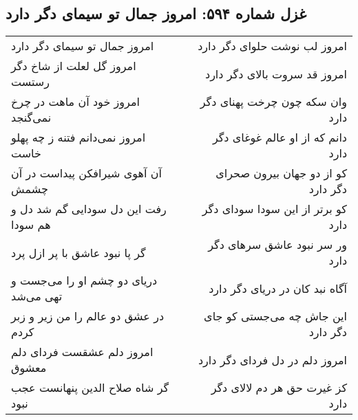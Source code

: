 \begin{center}
\section*{غزل شماره ۵۹۴: امروز جمال تو سیمای دگر دارد}
\label{sec:0594}
\begin{longtable}{l p{0.5cm} r}
امروز جمال تو سیمای دگر دارد
&&
امروز لب نوشت حلوای دگر دارد
\\
امروز گل لعلت از شاخ دگر رستست
&&
امروز قد سروت بالای دگر دارد
\\
امروز خود آن ماهت در چرخ نمی‌گنجد
&&
وان سکه چون چرخت پهنای دگر دارد
\\
امروز نمی‌دانم فتنه ز چه پهلو خاست
&&
دانم که از او عالم غوغای دگر دارد
\\
آن آهوی شیرافکن پیداست در آن چشمش
&&
کو از دو جهان بیرون صحرای دگر دارد
\\
رفت این دل سودایی گم شد دل و هم سودا
&&
کو برتر از این سودا سودای دگر دارد
\\
گر پا نبود عاشق با پر ازل پرد
&&
ور سر نبود عاشق سرهای دگر دارد
\\
دریای دو چشم او را می‌جست و تهی می‌شد
&&
آگاه نبد کان در دریای دگر دارد
\\
در عشق دو عالم را من زیر و زبر کردم
&&
این جاش چه می‌جستی کو جای دگر دارد
\\
امروز دلم عشقست فردای دلم معشوق
&&
امروز دلم در دل فردای دگر دارد
\\
گر شاه صلاح الدین پنهانست عجب نبود
&&
کز غیرت حق هر دم لالای دگر دارد
\\
\end{longtable}
\end{center}
